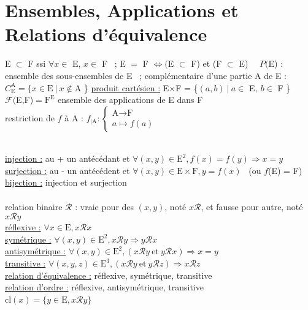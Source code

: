\documentclass[12 pt]{book}
\begin{document}
\section*{Ensembles, Applications et Relations d'équivalence}

\begin{flushleft}
\begin{doublespace}

	E $\subset$ F ssi $\forall x \in$ E, $x \in$ F \ ; E $=$ F $\Leftrightarrow ($E $\subset$ F) et (F $\subset$ E) \ \ 
	$P($E) : ensemble des sous-ensembles de E \ ; complémentaire d'une partie A de E : $C_\text{E}^\text{A} = \{ x\in \text{E} \ | \ x\notin \text{A}$ \}
	\underline{produit cartésien :} E$\times$F = \{$(a,b) \ | \ a\in$ E$ , \  b \in$ F \} \\
	$\mathcal{F} ($E,F)$ = \text{F}^\text{E}$ ensemble des applications de E dans F \\
	restriction de $f$ à A : $f_{| \text{A}} : \left\{\begin{array}{ll} \text{A}\rightarrow \text{F}  \\  a \mapsto f(a) \end{array} \right.$
	
	\text{ } \\
	\underline{injection :} au + un antécédant et $\forall(x,y)\in \text{E}^2, f(x) = f(y) \Rightarrow x=y$\\
	\underline{surjection :} au - un antécédent et $\forall (x,y) \in \text{E}\times\text{F}, y=f(x)$ \ (ou $f$(E) = F)\\
	\underline{bijection :} injection et surjection\\
	
	\text{ } \\
	relation binaire $\mathcal{R}$ : vraie pour des $(x,y)$, noté $x\mathcal{R}$, et fausse pour autre, noté $x\mathcal{R}y$ \\
	\underline{réflexive :} $\forall x \in \text{E}, x\mathcal{R}x$ \\
	\underline{symétrique :} $\forall (x,y) \in \text{E}^2, x\mathcal{R}y \Rightarrow y\mathcal{R}x$ \\
	\underline{antisymétrique :} $\forall (x,y) \in \text{E}^2, (x\mathcal{R}y \ \text{et} \ y\mathcal{R}x ) \Rightarrow x=y$ \\
	\underline{transitive :} $\forall (x,y,z) \in \text{E}^3, (x\mathcal{R}y \ \text{et} \  y\mathcal{R}z) \Rightarrow x\mathcal{R}z$ \\
	\underline{relation d'équivalence :} réflexive, symétrique, transitive \\
	\underline{relation d'ordre :} réflexive, antisymétrique, transitive \\
	cl$(x) = \{y \in \text{E}, x\mathcal{R}y \}$ \\
	
\end{doublespace}
\end{flushleft}
\end{document}
